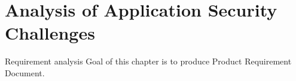 \chapter{Analysis of Application Security Challenges}
\label{ch:security-challenges}

Requirement analysis
Goal of this chapter is to produce Product Requirement Document.